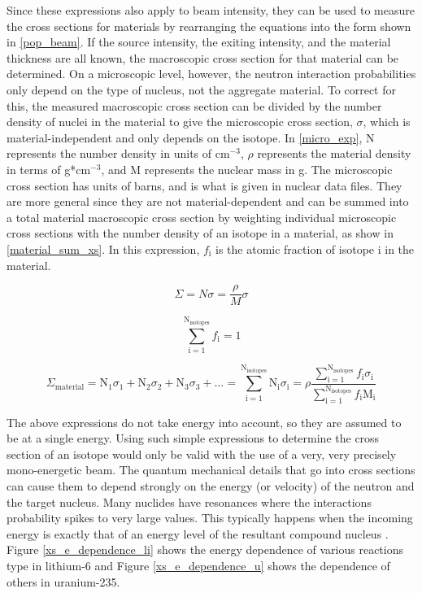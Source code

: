 Since these expressions also apply to beam intensity, they can be used to measure the cross sections for materials by rearranging the equations into the form shown in \eqref{pop_beam}.  If the source intensity, the exiting intensity, and the material thickness are all known, the macroscopic cross section for that material can be determined.  On a microscopic level, however, the neutron interaction probabilities only depend on the type of nucleus, not the aggregate material.  To correct for this, the measured macroscopic cross section can be divided by the number density of nuclei in the material to give the microscopic cross section, $\sigma$, which is material-independent and only depends on the isotope.  In \eqref{micro_exp}, N represents the number density in units of cm$^{-3}$, $\rho$ represents the material density in terms of g*cm$^{-3}$, and M represents the nuclear mass in g.  The microscopic cross section has units of barns, and is what is given in nuclear data files.  They are more general since they are not material-dependent and can be summed into a total material macroscopic cross section by weighting individual microscopic cross sections with the number density of an isotope in a material, as show in \eqref{material_sum_xs}.  In this expression, $f_\mathrm{i}$ is the atomic fraction of isotope i in the material.


\begin{equation}
\Sigma = N \sigma = \frac{\rho}{M} \sigma
\label{micro_exp}
\end{equation}

\begin{equation}
\sum_{\mathrm{i}=1}^{\mathrm{N}_\mathrm{isotopes}} f_\mathrm{i} =1
\label{fraction_norm}
\end{equation}

\begin{equation}
\Sigma_{\mathrm{material}} = \mathrm{N}_1 \sigma_1 +  \mathrm{N}_2 \sigma_2 + \mathrm{N}_3 \sigma_3+ ... = \sum_{\mathrm{i}=1}^{\mathrm{N}_\mathrm{isotopes}} \mathrm{N}_\mathrm{i} \sigma_\mathrm{i} = \rho\frac{\sum_{\mathrm{i}=1}^{\mathrm{N}_\mathrm{isotopes}} f_\mathrm{i}\sigma_\mathrm{i} } { \sum_{\mathrm{i}=1}^{\mathrm{N}_\mathrm{isotopes}} f_\mathrm{i} \mathrm{M}_\mathrm{i}}
\label{material_sum_xs}
\end{equation}

The above expressions do not take energy into account, so they are assumed to be at a single energy.  Using such simple expressions to determine the cross section of an isotope would only be valid with the use of a very, very precisely mono-energetic beam.  The quantum mechanical details that go into cross sections can cause them to depend strongly on the energy (or velocity) of the neutron and the target nucleus.  Many nuclides have resonances where the interactions probability spikes to very large values.  This typically happens when the incoming energy is exactly that of an energy level of the resultant compound nucleus \cite{duderstadt}.   Figure \ref{xs_e_dependence_li} shows the energy dependence of various reactions type in lithium-6 and Figure \ref{xs_e_dependence_u} shows the dependence of others in uranium-235.  

